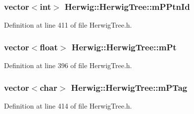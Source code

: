 \subsubsection[{\texorpdfstring{m\+P\+Ptn\+Id}{mPPtnId}}]{\setlength{\rightskip}{0pt plus 5cm}vector$<$int$>$ Herwig\+::\+Herwig\+Tree\+::m\+P\+Ptn\+Id\hspace{0.3cm}{\ttfamily [protected]}}\hypertarget{class_herwig_1_1_herwig_tree_a7dfcff3430486ec5f022b2ecce0ee62f}{}\label{class_herwig_1_1_herwig_tree_a7dfcff3430486ec5f022b2ecce0ee62f}


Definition at line 411 of file Herwig\+Tree.\+h.

\subsubsection[{\texorpdfstring{m\+Pt}{mPt}}]{\setlength{\rightskip}{0pt plus 5cm}vector$<$float$>$ Herwig\+::\+Herwig\+Tree\+::m\+Pt\hspace{0.3cm}{\ttfamily [protected]}}\hypertarget{class_herwig_1_1_herwig_tree_a545def11295a75086186c73aa393e0b4}{}\label{class_herwig_1_1_herwig_tree_a545def11295a75086186c73aa393e0b4}


Definition at line 396 of file Herwig\+Tree.\+h.

\subsubsection[{\texorpdfstring{m\+P\+Tag}{mPTag}}]{\setlength{\rightskip}{0pt plus 5cm}vector$<$char$>$ Herwig\+::\+Herwig\+Tree\+::m\+P\+Tag\hspace{0.3cm}{\ttfamily [protected]}}\hypertarget{class_herwig_1_1_herwig_tree_ad3e9614afd7e68fee47bc102067d3a15}{}\label{class_herwig_1_1_herwig_tree_ad3e9614afd7e68fee47bc102067d3a15}


Definition at line 414 of file Herwig\+Tree.\+h.


